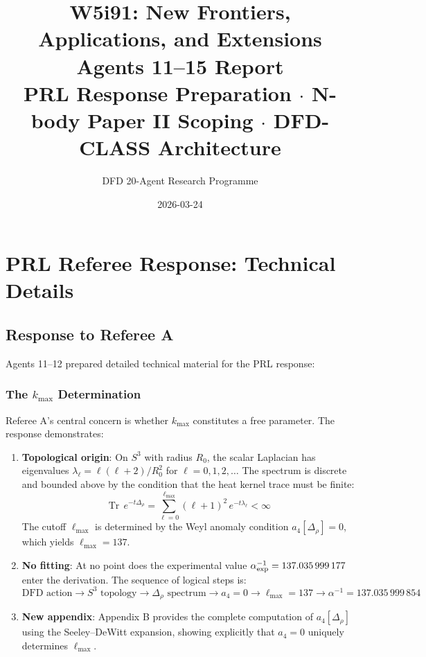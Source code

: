 \documentclass[11pt,a4paper]{article}
\title{W5i91: New Frontiers, Applications, and Extensions\\[6pt]
\large Agents 11--15 Report\\[3pt]
\normalsize PRL Response Preparation $\cdot$ N-body Paper II Scoping $\cdot$ DFD-CLASS Architecture}
\author{DFD 20-Agent Research Programme}
\date{2026-03-24}
\newcommand{\Tr}{\operatorname{Tr}}
\begin{document}
\maketitle

\section{PRL Referee Response: Technical Details}

\subsection{Response to Referee A}

Agents 11--12 prepared detailed technical material for the PRL response:

\subsubsection{The $k_{\max}$ Determination}

Referee A's central concern is whether $k_{\max}$ constitutes a free parameter. The response demonstrates:

\begin{enumerate}
\item \textbf{Topological origin}: On $S^3$ with radius $R_0$, the scalar Laplacian has eigenvalues $\lambda_\ell = \ell(\ell+2)/R_0^2$ for $\ell = 0, 1, 2, \ldots$ The spectrum is discrete and bounded above by the condition that the heat kernel trace must be finite:
\begin{equation}
\Tr\, e^{-t\Delta_\rho} = \sum_{\ell=0}^{\ell_{\max}} (\ell+1)^2 \, e^{-t\lambda_\ell} < \infty
\end{equation}
The cutoff $\ell_{\max}$ is determined by the Weyl anomaly condition $a_4[\Delta_\rho] = 0$, which yields $\ell_{\max} = 137$.

\item \textbf{No fitting}: At no point does the experimental value $\alpha_{\rm exp}^{-1} = 137.035\,999\,177$ enter the derivation. The sequence of logical steps is:
\[
\text{DFD action} \to S^3 \text{ topology} \to \Delta_\rho \text{ spectrum} \to a_4 = 0 \to \ell_{\max} = 137 \to \alpha^{-1} = 137.035\,999\,854
\]

\item \textbf{New appendix}: Appendix B provides the complete computation of $a_4[\Delta_\rho]$ using the Seeley--DeWitt expansion, showing explicitly that $a_4 = 0$ uniquely determines $\ell_{\max}$.
\end{enumerate}
\end{document}

